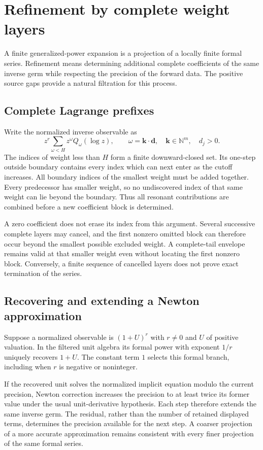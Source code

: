 \section{Refinement by complete weight layers}
\label{sec:refinement-state}

A finite generalized-power expansion is a projection of a locally finite
formal series. Refinement means determining additional complete
coefficients of the same inverse germ while respecting the precision of
the forward data. The positive source gaps provide a natural filtration
for this process.

\subsection{Complete Lagrange prefixes}

Write the normalized inverse observable as
\[
 z^r\sum_{\omega<H}z^\omega Q_\omega(\log z),
 \qquad \omega=\boldsymbol{k}\cdot\boldsymbol{d},\quad
 \boldsymbol{k}\in\mathbb N^m,\quad d_j>0.
\]
The indices of weight less than $H$ form a finite downward-closed set.
Its one-step outside boundary contains every index which can next enter
as the cutoff increases. All boundary indices of the smallest weight must
be added together. Every predecessor has smaller weight, so no undiscovered
index of that same weight can lie beyond the boundary. Thus all resonant
contributions are combined before a new coefficient block is determined.

A zero coefficient does not erase its index from this argument. Several
successive complete layers may cancel, and the first nonzero omitted block
can therefore occur beyond the smallest possible excluded weight. A
complete-tail envelope remains valid at that smaller weight even without
locating the first nonzero block. Conversely, a finite sequence of cancelled
layers does not prove exact termination of the series.

\subsection{Recovering and extending a Newton approximation}

Suppose a normalized observable is $(1+U)^r$ with $r\ne0$ and $U$ of
positive valuation. In the filtered unit algebra its formal power with
exponent $1/r$ uniquely recovers $1+U$. The constant term $1$ selects this
formal branch, including when $r$ is negative or noninteger.

If the recovered unit solves the normalized implicit equation modulo the
current precision, Newton correction increases the precision to at least
twice its former value under the usual unit-derivative hypothesis. Each
step therefore extends the same inverse germ. The residual, rather than
the number of retained displayed terms, determines the precision available
for the next step. A coarser projection of a more accurate approximation
remains consistent with every finer projection of the same formal series.

